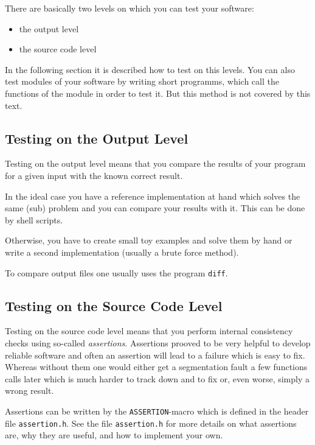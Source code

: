 \documentclass[12pt]{article}
\begin{document}
There are basically two levels on which you can test your software:
\begin{itemize}
\item the output level
\item the source code level
\end{itemize}
In the following section it is described how to test on this levels.
You can also test modules of your software by writing short programms, which 
call the functions of the module in order to test it. But this method is not covered by this text.

\subsection*{Testing on the Output Level}
Testing on the output level means that you compare the results of your program for a given input with the known correct result.

In the ideal case you have a reference implementation at hand which solves the same (sub) problem and you can compare your results with it. This can be done by shell scripts. 

Otherwise, you have to create small toy examples and solve them by hand or write a second implementation (usually a brute force method).

To compare output files one usually uses the program \texttt{diff}.


\subsection*{Testing on the Source Code Level}
Testing on the source code level means that you perform internal consistency checks using so-called \emph{assertions}.
Assertions prooved to be very helpful to develop reliable 
software and often an assertion will lead to a failure which is easy to fix.
Whereas without them one would either get a segmentation fault a few 
functions calls later which is much harder to track down and to fix or, even
worse, simply a wrong result.

Assertions can be written by the \texttt{ASSERTION}-macro which is defined
in the header file \texttt{assertion.h}.
See the file \texttt{assertion.h} for more details on what assertions are,
why they are useful, and how to implement your own. 
\end{document}
